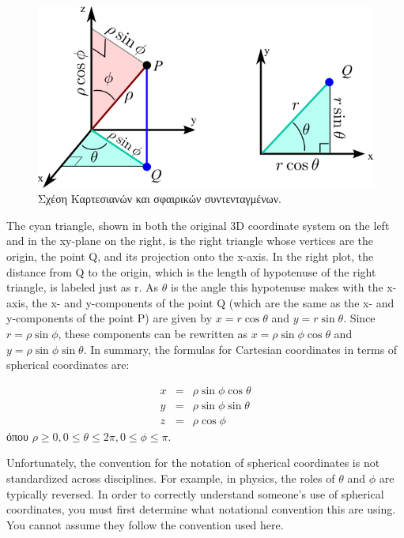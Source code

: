 \begin{figure}[h]
    \centering
    \includegraphics[scale=0.5]{Figures/appendixA_spherical_coordinates_analytical.png}
    \caption{Σχέση Καρτεσιανών και σφαιρικών συντενταγμένων.}
    \label{fig:apxA_spherical_coordinates_derivation}
\end{figure}

The cyan triangle, shown in both the original 3D coordinate system on the left and in the xy-plane on the right, is the right triangle whose vertices are the origin, the point Q, and its projection onto the x-axis. In the right plot, the distance from Q to the origin, which is the length of hypotenuse of the right triangle, is labeled just as r. As $\theta$ is the angle this hypotenuse makes with the x-axis, the x- and y-components of the point Q (which are the same as the x- and y-components of the point P) are given by $x = r \cos \theta$ and $y = r \sin \theta$. Since $r = \rho \sin \phi$, these components can be rewritten as $x = \rho \sin \phi \cos \theta$ and $y = \rho \sin \phi \sin \theta$. In summary, the formulas for Cartesian coordinates in terms of spherical coordinates are:

\begin{eqnarray}
    x &=& \rho \sin \phi \cos \theta \\
    y &=& \rho \sin \phi \sin \theta \\
    z &=& \rho \cos \phi
\end{eqnarray}
όπου $\rho \geq 0, 0 \leq \theta \leq 2\pi, 0 \leq \phi \leq \pi$.

Unfortunately, the convention for the notation of spherical coordinates is not standardized across disciplines. For example, in physics, the roles of $\theta$ and $\phi$ are typically reversed. In order to correctly understand someone's use of spherical coordinates, you must first determine what notational convention this are using. You cannot assume they follow the convention used here.
